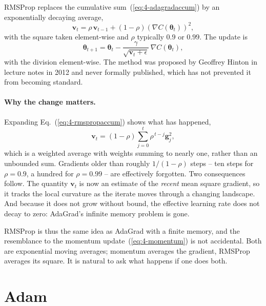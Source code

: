 RMSProp replaces the cumulative sum~(\ref{eq:4-adagradaccum}) by an
exponentially decaying average,
\begin{equation}
  \bm{v}_t = \rho\,\bm{v}_{t-1} + (1-\rho)\left(\nabla C(\bm{\theta}_t)\right)^{2},
  \label{eq:4-rmspropaccum}
\end{equation}
with the square taken element-wise and $\rho$ typically $0.9$ or $0.99$.  The
update is
\begin{equation}
  \boxed{\;
  \bm{\theta}_{t+1} = \bm{\theta}_t
    - \frac{\gamma}{\sqrt{\bm{v}_t+\epsilon}}\,\nabla C(\bm{\theta}_t) , \;}
  \label{eq:4-rmsprop}
\end{equation}
with the division element-wise.  The method was proposed by Geoffrey Hinton in
lecture notes in 2012 and never formally published, which has not prevented it
from becoming standard.

\paragraph{Why the change matters.}
Expanding Eq.~(\ref{eq:4-rmspropaccum}) shows what has happened,
\begin{equation}
  \bm{v}_t = (1-\rho)\sum_{j=0}^{t}\rho^{\,t-j}\bm{g}_j^{2},
  \label{eq:4-rmspropsum}
\end{equation}
which is a weighted average with weights summing to nearly one, rather than an
unbounded sum.  Gradients older than roughly $1/(1-\rho)$ steps -- ten steps
for $\rho=0.9$, a hundred for $\rho=0.99$ -- are effectively forgotten.  Two
consequences follow.  The quantity $\bm{v}_t$ is now an estimate of the
\emph{recent} mean square gradient, so it tracks the local curvature as the
iterate moves through a changing landscape.  And because it does not grow
without bound, the effective learning rate does not decay to zero: AdaGrad's
infinite memory problem is gone.

RMSProp is thus the same idea as AdaGrad with a finite memory, and the
resemblance to the momentum update~(\ref{eq:4-momentum}) is not accidental.
Both are exponential moving averages; momentum averages the gradient, RMSProp
averages its square.  It is natural to ask what happens if one does both.

\section{Adam}
\label{sec:adam}

